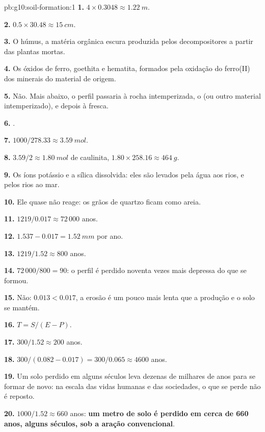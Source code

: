 \begin{solution}{pb:g10:soil-formation:1}
\textbf{1.} $4 \times 0.3048 \approx \qty{1.22}{m}$.

\textbf{2.} $0.5 \times 30.48 \approx \qty{15}{cm}$.

\textbf{3.} O húmus, a matéria orgânica escura produzida pelos
decompositores a partir das plantas mortas.

\textbf{4.} Os óxidos de ferro, goethita e hematita, formados pela oxidação
do ferro(II) dos minerais do material de origem.

\textbf{5.} Não. Mais abaixo, o perfil passaria à rocha intemperizada, o
 (ou outro material intemperizado), e depois à  fresca.

\textbf{6.} .

\textbf{7.} $1000/278.33 \approx \qty{3.59}{mol}$.

\textbf{8.} $3.59/2 \approx \qty{1.80}{mol}$ de caulinita, $1.80 \times 258.16
\approx \qty{464}{g}$.

\textbf{9.} Os íons potássio e a sílica dissolvida: eles são levados pela
água aos rios, e pelos rios ao mar.

\textbf{10.} Ele quase não reage: os grãos de quartzo ficam como areia.

\textbf{11.} $1219/0.017 \approx 72\,000$ anos.

\textbf{12.} $1.537 - 0.017 = \qty{1.52}{mm}$ por ano.

\textbf{13.} $1219/1.52 \approx 800$ anos.

\textbf{14.} $72\,000/800 = 90$: o perfil é perdido noventa vezes mais
depressa do que se formou.

\textbf{15.} Não: $0.013 < 0.017$, a erosão é um pouco mais lenta que a
produção e o solo se mantém.

\textbf{16.} $T = S/(E - P)$.

\textbf{17.} $300/1.52 \approx 200$ anos.

\textbf{18.} $300/(0.082 - 0.017) = 300/0.065 \approx 4600$ anos.

\textbf{19.} Um solo perdido em alguns séculos leva dezenas de milhares de
anos para se formar de novo: na escala das vidas humanas e das sociedades, o
que se perde não é reposto.

\textbf{20.} $1000/1.52 \approx 660$ anos: \textbf{um metro de solo é
perdido em cerca de 660 anos, alguns séculos, sob a aração convencional}.
\end{solution}
